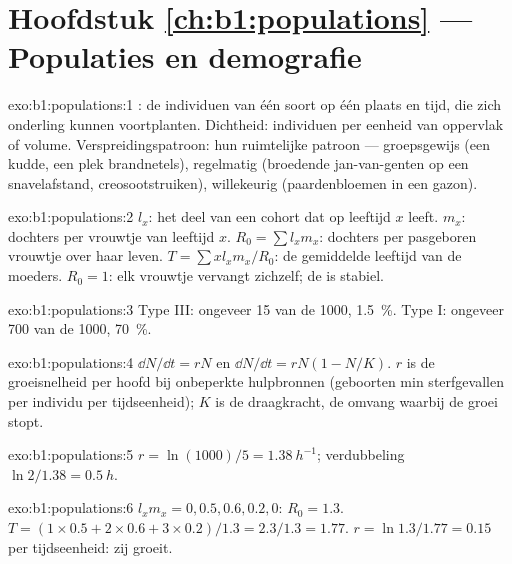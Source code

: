 \section*{Hoofdstuk \ref{ch:b1:populations} --- Populaties en demografie}

\begin{solution}{exo:b1:populations:1}
: de individuen van één soort op één plaats en tijd, die zich
onderling kunnen voortplanten. Dichtheid: individuen per eenheid van
oppervlak of volume. Verspreidingspatroon: hun ruimtelijke patroon ---
groepsgewijs (een kudde, een plek brandnetels), regelmatig (broedende
jan-van-genten op een snavelafstand, creosootstruiken), willekeurig
(paardenbloemen in een gazon).
\end{solution}

\begin{solution}{exo:b1:populations:2}
$l_x$: het deel van een cohort dat op leeftijd $x$ leeft. $m_x$: dochters
per vrouwtje van leeftijd $x$. $R_0 = \sum l_x m_x$: dochters per
pasgeboren vrouwtje over haar leven. $T = \sum x l_x m_x / R_0$: de
gemiddelde leeftijd van de moeders. $R_0 = 1$: elk vrouwtje vervangt
zichzelf; de  is stabiel.
\end{solution}

\begin{solution}{exo:b1:populations:3}
Type III: ongeveer 15 van de 1000, \qty{1.5}{\%}. Type I: ongeveer 700 van
de 1000, \qty{70}{\%}.
\end{solution}

\begin{solution}{exo:b1:populations:4}
$\dd N/\dd t = rN$ en $\dd N/\dd t = rN(1 - N/K)$. $r$ is de groeisnelheid
per hoofd bij onbeperkte hulpbronnen (geboorten min sterfgevallen per
individu per tijdseenheid); $K$ is de draagkracht, de omvang waarbij de
groei stopt.
\end{solution}

\begin{solution}{exo:b1:populations:5}
$r = \ln(1000)/5 = \qty{1.38}{h^{-1}}$; verdubbeling $\ln 2/1.38 =
\qty{0.5}{h}$.
\end{solution}

\begin{solution}{exo:b1:populations:6}
$l_x m_x = 0, 0.5, 0.6, 0.2, 0$: $R_0 = 1.3$. $T = (1\times 0.5 +
2\times 0.6 + 3\times 0.2)/1.3 = 2.3/1.3 = 1.77$. $r = \ln 1.3/1.77 =
\qty{0.15}{}$ per tijdseenheid: zij groeit.
\end{solution}

